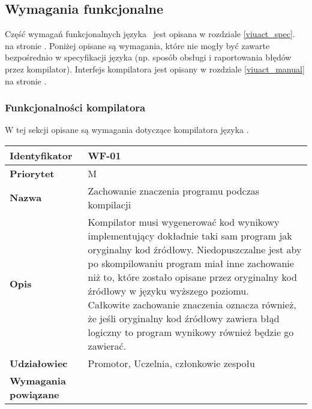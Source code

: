 \subsection{Wymagania funkcjonalne}

Część wymagań funkcjonalnych języka \ViuAct\ jest opisana w rozdziale
\ref{viuact_spec}.~ na stronie \pageref{viuact_spec}.
Poniżej opisane są wymagania, które nie mogły być zawarte bezpośrednio w specyfikacji języka (np. sposób
obsługi i raportowania błędów przez kompilator).
Interfejs kompilatora jest opisany w rozdziale \ref{viuact_manual} na stronie \pageref{viuact_manual}.

\subsubsection{Funkcjonalności kompilatora}

W tej sekcji opisane są wymagania dotyczące kompilatora języka \ViuAct.

\vspace{1em}

\begin{tabular}{ | l | l | }
    \hline
    \textbf{Identyfikator} & \parbox[t]{11cm}{WF-01} \\
    \hline
    \textbf{Priorytet} & M \\
    \hline
    \textbf{Nazwa} & Zachowanie znaczenia programu podczas kompilacji \\
    \hline
    \textbf{Opis} & \parbox[t]{11cm}{
        Kompilator musi wygenerować kod wynikowy implementujący dokładnie taki sam program jak oryginalny
        kod źródłowy. Niedopuszczalne jest aby po skompilowaniu program miał inne zachowanie niż to, które
        zostało opisane przez oryginalny kod źródłowy w języku wyższego poziomu.
        \\
        Całkowite zachowanie znaczenia oznacza również, że jeśli oryginalny kod źródłowy zawiera błąd
        logiczny to program wynikowy również będzie go zawierać.
    } \\
    \hline
    \textbf{Udziałowiec} & Promotor, Uczelnia, członkowie zespołu \\
    \hline
    \textbf{Wymagania powiązane} & \phantom{} \\
    \hline
\end{tabular}

\vspace{1em}

